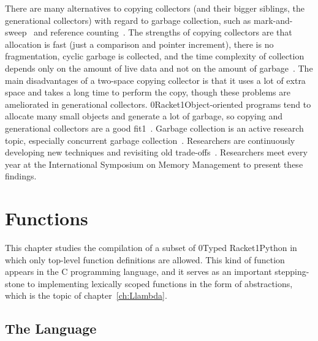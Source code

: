 \documentclass[7x10]{TimesAPriori_MIT}%
\def\racketEd{0}
\def\pythonEd{1}
\providecommand{\BookEdition}{1}
\let\edition\BookEdition
\newcommand{\racket}[1]{{\if\edition\racketEd{#1}\fi}}
\newcommand{\pythonColor}[0]{}
\newcommand{\python}[1]{{\if\edition\pythonEd\pythonColor #1\fi}}
\numberwithin{theorem}{chapter}
\numberwithin{definition}{chapter}
\numberwithin{equation}{chapter}
\begin{document}
There are many alternatives to copying collectors (and their bigger
siblings, the generational collectors) with regard to garbage
collection, such as mark-and-sweep~\citep{McCarthy:1960dz} and
reference counting~\citep{Collins:1960aa}.  The strengths of copying
collectors are that allocation is fast (just a comparison and pointer
increment), there is no fragmentation, cyclic garbage is collected,
and the time complexity of collection depends only on the amount of
live data and not on the amount of garbage~\citep{Wilson:1992fk}. The
main disadvantages of a two-space copying collector is that it uses a
lot of extra space and takes a long time to perform the copy, though
these problems are ameliorated in generational collectors.
\racket{Racket}\python{Object-oriented} programs tend to allocate many
small objects and generate a lot of garbage, so copying and
generational collectors are a good fit\python{~\citep{Dieckmann99}}.
Garbage collection is an active research topic, especially concurrent
garbage collection~\citep{Tene:2011kx}. Researchers are continuously
developing new techniques and revisiting old
trade-offs~\citep{Blackburn:2004aa,Jones:2011aa,Shahriyar:2013aa,Cutler:2015aa,Shidal:2015aa,Osterlund:2016aa,Jacek:2019aa,Gamari:2020aa}. Researchers
meet every year at the International Symposium on Memory Management to
present these findings.


\chapter{Functions}
\label{ch:Lfun}
\setcounter{footnote}{0}

This chapter studies the compilation of a subset of \racket{Typed
  Racket}\python{Python} in which only top-level function definitions
are allowed. This kind of function appears in the C programming
language, and it serves as an important stepping-stone to implementing
lexically scoped functions in the form of 
abstractions, which is the topic of chapter~\ref{ch:Llambda}.

\section{The \LangFun{} Language}
\end{document}
